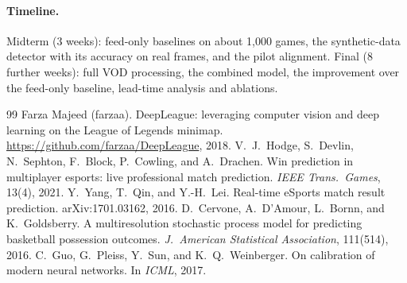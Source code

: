 \documentclass{article}
\begin{document}
\paragraph{Timeline.}
Midterm (3 weeks): feed-only baselines on about 1{,}000 games, the synthetic-data detector with its accuracy on real frames, and the pilot alignment.
Final (8 further weeks): full VOD processing, the combined model, the improvement over the feed-only baseline, lead-time analysis and ablations.

\begin{thebibliography}{99}
 Farza Majeed (farzaa). \newblock DeepLeague: leveraging computer vision and deep learning on the League of Legends minimap. \newblock \url{https://github.com/farzaa/DeepLeague}, 2018.
 V.~J.~Hodge, S.~Devlin, N.~Sephton, F.~Block, P.~Cowling, and A.~Drachen. \newblock Win prediction in multiplayer esports: live professional match prediction. \newblock \emph{IEEE Trans.\ Games}, 13(4), 2021.
 Y.~Yang, T.~Qin, and Y.-H.~Lei. \newblock Real-time eSports match result prediction. \newblock arXiv:1701.03162, 2016.
 D.~Cervone, A.~D'Amour, L.~Bornn, and K.~Goldsberry. \newblock A multiresolution stochastic process model for predicting basketball possession outcomes. \newblock \emph{J.\ American Statistical Association}, 111(514), 2016.
 C.~Guo, G.~Pleiss, Y.~Sun, and K.~Q.~Weinberger. \newblock On calibration of modern neural networks. \newblock In \emph{ICML}, 2017.
\end{thebibliography}
\end{document}
